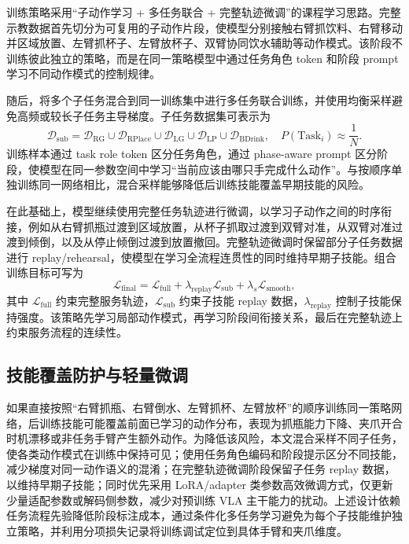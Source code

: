 \documentclass[UTF8,a4paper,zihao=5,scheme=chinese]{ctexart}
\numberwithin{figure}{section}
\numberwithin{table}{section}
\begin{document}
训练策略采用“子动作学习 + 多任务联合 + 完整轨迹微调”的课程学习思路。完整示教数据首先切分为可复用的子动作片段，使模型分别接触右臂抓饮料、右臂移动并区域放置、左臂抓杯子、左臂放杯子、双臂协同饮水辅助等动作模式。该阶段不训练彼此独立的策略，而是在同一策略模型中通过任务角色 token 和阶段 prompt 学习不同动作模式的控制规律。

随后，将多个子任务混合到同一训练集中进行多任务联合训练，并使用均衡采样避免高频或较长子任务主导梯度。子任务数据集可表示为
\[
\mathcal{D}_{\mathrm{sub}}=
\mathcal{D}_{\mathrm{RG}}\cup
\mathcal{D}_{\mathrm{RPlace}}\cup
\mathcal{D}_{\mathrm{LG}}\cup
\mathcal{D}_{\mathrm{LP}}\cup
\mathcal{D}_{\mathrm{BDrink}},
\quad
P(\mathrm{Task}_i)\approx \frac{1}{N}.
\]
训练样本通过 task role token 区分任务角色，通过 phase-aware prompt 区分阶段，使模型在同一参数空间中学习“当前应该由哪只手完成什么动作”。与按顺序单独训练同一网络相比，混合采样能够降低后训练技能覆盖早期技能的风险。

在此基础上，模型继续使用完整任务轨迹进行微调，以学习子动作之间的时序衔接，例如从右臂抓瓶过渡到区域放置，从杯子抓取过渡到双臂对准，从双臂对准过渡到倾倒，以及从停止倾倒过渡到放置撤回。完整轨迹微调时保留部分子任务数据进行 replay/rehearsal，使模型在学习全流程连贯性的同时维持早期子技能。组合训练目标可写为
\[
\mathcal{L}_{\mathrm{final}}=
\mathcal{L}_{\mathrm{full}}+
\lambda_{\mathrm{replay}}\mathcal{L}_{\mathrm{sub}}+
\lambda_s\mathcal{L}_{\mathrm{smooth}},
\]
其中 $\mathcal{L}_{\mathrm{full}}$ 约束完整服务轨迹，$\mathcal{L}_{\mathrm{sub}}$ 约束子技能 replay 数据，$\lambda_{\mathrm{replay}}$ 控制子技能保持强度。该策略先学习局部动作模式，再学习阶段间衔接关系，最后在完整轨迹上约束服务流程的连续性。

\subsection{技能覆盖防护与轻量微调}

如果直接按照“右臂抓瓶、右臂倒水、左臂抓杯、左臂放杯”的顺序训练同一策略网络，后训练技能可能覆盖前面已学习的动作分布，表现为抓瓶能力下降、夹爪开合时机漂移或非任务手臂产生额外动作。为降低该风险，本文混合采样不同子任务，使各类动作模式在训练中保持可见；使用任务角色编码和阶段提示区分不同技能，减少梯度对同一动作语义的混淆；在完整轨迹微调阶段保留子任务 replay 数据，以维持早期子技能；同时优先采用 LoRA/adapter 类参数高效微调方式，仅更新少量适配参数或解码侧参数，减少对预训练 VLA 主干能力的扰动。上述设计依赖任务流程先验降低阶段标注成本，通过条件化多任务学习避免为每个子技能维护独立策略，并利用分项损失记录将训练调试定位到具体手臂和夹爪维度。
\end{document}
